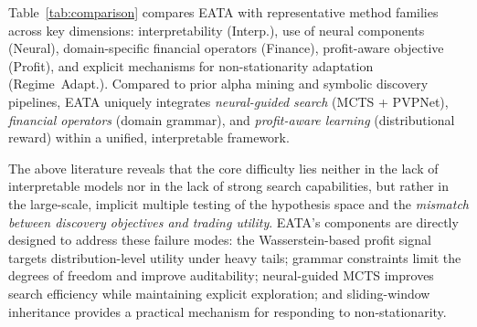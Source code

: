 \begin{table}[htbp]
\centering
\caption{Comparison with Related Approaches}
\label{tab:comparison}
\end{table}

Table~\ref{tab:comparison} compares EATA with representative method families across key dimensions: interpretability (Interp.), use of neural components (Neural), domain-specific financial operators (Finance), profit-aware objective (Profit), and explicit mechanisms for non-stationarity adaptation (Regime~Adapt.). Compared to prior alpha mining and symbolic discovery pipelines, EATA uniquely integrates \emph{neural-guided search} (MCTS + PVPNet), \emph{financial operators} (domain grammar), and \emph{profit-aware learning} (distributional reward) within a unified, interpretable framework.

The above literature reveals that the core difficulty lies neither in the lack of interpretable models nor in the lack of strong search capabilities, but rather in the large-scale, implicit multiple testing of the hypothesis space and the \emph{mismatch between discovery objectives and trading utility}. EATA's components are directly designed to address these failure modes: the Wasserstein-based profit signal targets distribution-level utility under heavy tails; grammar constraints limit the degrees of freedom and improve auditability; neural-guided MCTS improves search efficiency while maintaining explicit exploration; and sliding-window inheritance provides a practical mechanism for responding to non-stationarity.